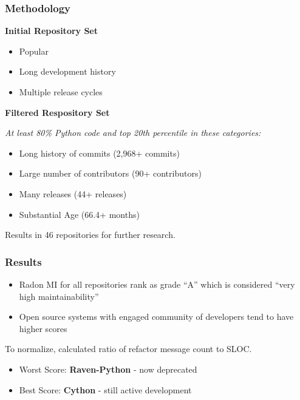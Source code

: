 \documentclass{beamer}
\begin{document}
\begin{frame}
  \frametitle{Methodology}
  \textbf{Initial Repository Set}
  \begin{itemize}
    \item Popular
    \item Long development history
    \item Multiple release cycles
  \end{itemize}

  \vspace{0.35cm}
  \textbf{Filtered Respository Set}
  
  \emph{At least 80\% Python code and top 20th percentile in these categories:}
  \begin{itemize}
    \item Long history of commits (2,968+ commits)
    \item Large number of contributors (90+ contributors)
    \item Many releases (44+ releases)
    \item Substantial Age (66.4+ months)
  \end{itemize}

  \vspace{0.35cm}
  Results in 46 repositories for further research.
\end{frame}

\begin{frame}
  \frametitle{Results}
  \begin{itemize}
    \item Radon MI for all repositories rank as grade ``A''
    \newline which is considered ``very high maintainability''
    \item Open source systems with engaged community 
    \newline of developers tend to have higher scores
  \end{itemize}

  \vspace{0.35cm}
  To normalize, calculated ratio of refactor message count to SLOC.
  
  \vspace{0.35cm}
  \begin{itemize}
    \item Worst Score: \textbf{Raven-Python} - now deprecated
    \item Best Score: \textbf{Cython} - still active development
  \end{itemize}
\end{frame}
\end{document}
